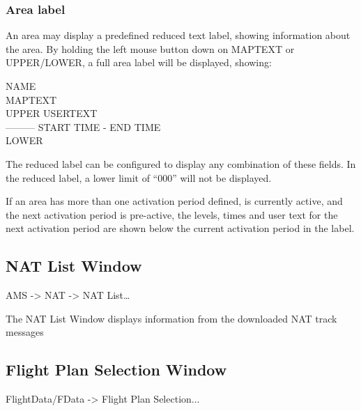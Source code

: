 \documentclass[a4paper,oneside,11pt]{memoir}
\begin{document}
  

\subsubsection{Area label}

An area may display a predefined reduced text label, showing information about the area. By holding the left mouse button down on MAPTEXT or UPPER/LOWER, a full area label will be displayed, showing:

\begin{center}
  NAME\\
  MAPTEXT\\
  UPPER USERTEXT \\
  --------- START TIME - END TIME\\
  LOWER\\
\end{center}

The reduced label can be configured to display any combination of these fields. In the reduced label, a lower limit of “000” will not be displayed.

\bigskip

If an area has more than one activation period defined, is currently active, and the next activation period is pre-active, the levels, times and user text for the next activation period are shown below the current activation period in the label.

\subsection{NAT List Window}\label{win:natlw}

 AMS -> NAT -> NAT List…


The NAT List Window displays information from the downloaded NAT track messages

\subsection{Flight Plan Selection Window}
\label{win:fpsw}

 FlightData/FData -> Flight Plan Selection...

\bigskip

\end{document}
